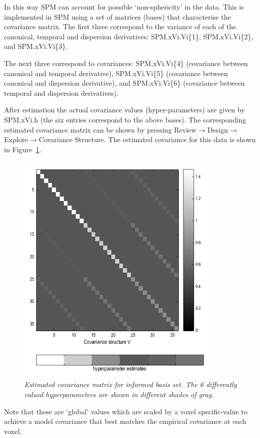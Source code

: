 \documentclass[a4paper,titlepage]{book}
\begin{document}
In this way SPM can account for possible `non-sphericity' in the data. This is implemented in SPM using a set of matrices (bases) that characterise the covariance matrix. The first three correspond to the variance of each of the canonical, temporal and dispersion derivatives:  SPM.xVi.Vi\{1\}, SPM.xVi.Vi\{2\}, and SPM.xVi.Vi\{3\}.

The next three correspond to covariances: SPM.xVi.Vi\{4\} (covariance between canonical and temporal derivative), SPM.xVi.Vi\{5\} (covariance between canonical and dispersion derivative), and SPM.xVi.Vi\{6\} (covariance between temporal and dispersion 
derivatives).

After estimation the actual covariance values (hyper-parameters) are given by SPM.xVi.h (the six entries correspond to the above bases). The corresponding estimated 
covariance matrix can be shown by pressing Review$\rightarrow$Design$\rightarrow$Explore$\rightarrow$Covariance Structure. The estimated covariance for this data is shown in Figure~\ref{informed_covariance}.
\begin{figure}
\begin{center}
\includegraphics[width=100mm]{faces_group/informed_covariance}
\caption{\em Estimated covariance matrix for informed basis set. The 6 differently valued hyperparameters are shown in different shades of gray. \label{informed_covariance}}
\end{center}
\end{figure}
Note that these are `global' values which are scaled by a voxel specific-value to achieve a model covariance that best matches the empirical covariance at each voxel. 
\end{document}
